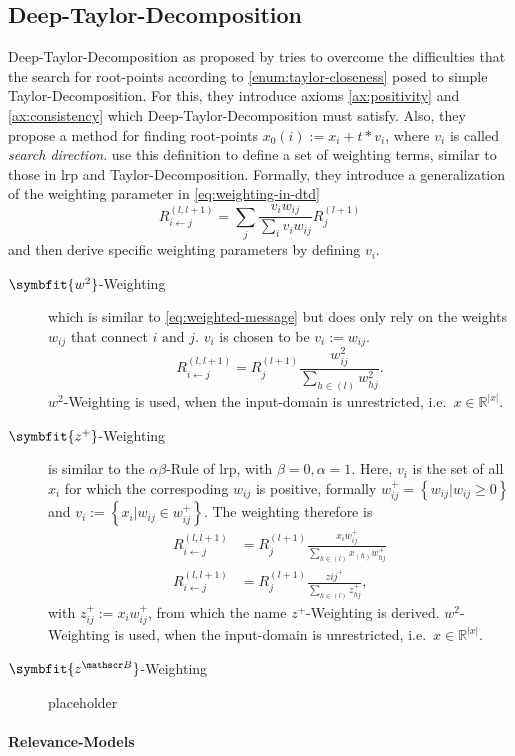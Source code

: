 \subsection{Deep-Taylor-Decomposition}
Deep-Taylor-Decomposition as proposed by  tries to overcome the difficulties that the search for root-points according to \cref{enum:taylor-closeness} posed to simple Taylor-Decomposition. For this, they introduce axioms \ref{ax:positivity} and \ref{ax:consistency} which Deep-Taylor-Decomposition must satisfy. Also, they propose a method for finding root-points \(x_0(i):= x_i + t*v_i\), where \(v_i\) is called \textit{search direction}. \citeauthor{Montavon.2017} use this definition to define a set of weighting terms, similar to those in \gls{lrp} and Taylor-Decomposition. Formally, they introduce a generalization of the weighting parameter in \cref{eq:weighting-in-dtd}\cite[see][Supplementary Material]{Montavon.2017}
\begin{equation}
    R_{i\leftarrow j}^{(l,l+1)} = \sum_j \frac{v_i w_{ij}}{\sum_i v_i w_{ij}} R_j^{(l+1)}\label{eq:weighting-in-dtd}
\end{equation}
and then derive specific weighting parameters by defining \(v_i\).
\begin{description}
    \item[\(\symbfit{w^2}\)-Weighting] which is similar to \cref{eq:weighted-message} but does only rely on the weights \(w_{ij}\) that connect \(i \text{ and } j\). \(v_i\) is chosen to be \(v_i:=w_{ij}\).
    \begin{equation}
        R_{i\leftarrow j}^{(l,l+1)} = R_{j}^{(l+1)} \frac{w_{ij}^2}{\sum_{h\in (l)} w_{hj}^2}.\label{eq:w2-weighting-dtd}
    \end{equation}
    \(w^2\)-Weighting is used, when the input-domain is unrestricted, i.e.\ \(x\in \mathbb R^{|x|}\).
    \item[\(\symbfit{z^+}\)-Weighting] is similar to the \(\alpha \beta\)-Rule of \gls{lrp}, with \(\beta=0, \alpha=1\). Here, \(v_i\) is the set of all \(x_i\) for which the correspoding \(w_{ij}\) is positive, formally \(w_{ij}^{+} = \left\{w_{ij} | w_{ij}\geq 0\right\}\) and \(v_i:=\left\{x_i|w_{ij}\in w_{ij}^{+}\right\}\). The weighting therefore is
    \begin{align}
        R_{i\leftarrow j}^{(l,l+1)} &= R_{j}^{(l+1)} \frac{x_i w_{ij}^{+}}{\sum_{h\in (l)} x_(h) w_{hj}^{+}}\\
        R_{i\leftarrow j}^{(l,l+1)} &= R_{j}^{(l+1)} \frac{z{ij}^{+}}{\sum_{h\in (l)} z_{hj}^{+}},
    \end{align}
    with \(z_{ij}^{+}:= x_i w_{ij}^{+}\), from which the name \(z^{+}\)-Weighting is derived.
    \(w^2\)-Weighting is used, when the input-domain is unrestricted, i.e.\ \(x\in \mathbb R^{|x|}\).
    \item[\(\symbfit{z^{\mathscr B}}\)-Weighting] placeholder 
\end{description}
\par
\blindtext[1]
\paragraph{Relevance-Models}
\blindtext[1]